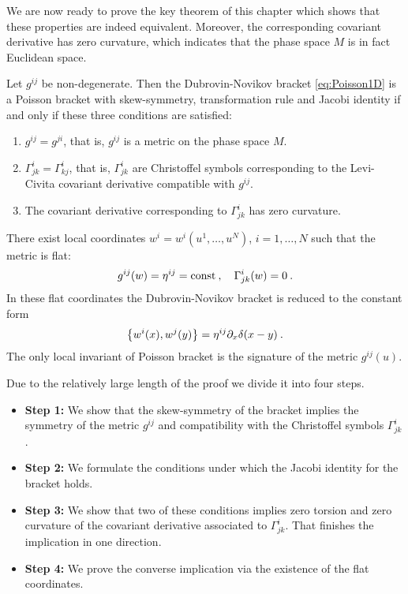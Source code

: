 We are now ready to prove the key theorem of this chapter which shows that these properties are indeed equivalent. Moreover, the corresponding covariant derivative has zero curvature, which indicates that the phase space $M$ is in fact Euclidean space.

\begin{theorem} \label{Theorem-Dubrovin-Novikov-1D}
    Let $g^{ij}$ be non-degenerate. Then the Dubrovin-Novikov bracket \eqref{eq:Poisson1D} is a Poisson bracket with skew-symmetry, transformation rule and Jacobi identity if and only if these three conditions are satisfied:
    \begin{enumerate}
        \item $g^{ij} = g^{ji}$, that is, $g^{ij}$ is a metric on the phase space $M$.
        \item $\Gamma^{i}_{jk} = \Gamma^i_{kj}$, that is, $\Gamma^{i}_{jk}$ are Christoffel symbols corresponding to the Levi-Civita covariant derivative compatible with $g^{ij}$.
        \item The covariant derivative corresponding to $\Gamma^{i}_{jk}$ has zero curvature.
    \end{enumerate}
\end{theorem}

\begin{corollary} \label{Corollary: existence of flat coordinates}
    There exist local coordinates $w^i = w^i(u^1, \dots, u^N)$, $i = 1, \dots, N$ such that the metric is flat:
    \begin{align}
        g^{ij}(w) = \eta^{ij} = \mathrm{const} \:, \quad \Gamma^i_{jk} (w) = 0 \:.
    \end{align}
    In these flat coordinates the Dubrovin-Novikov bracket is reduced to the constant form
    \begin{align}
        \left \lbrace w^i(x),w^j(y) \right \rbrace = \eta^{ij} \partial_x \delta(x-y) \:.
    \end{align}
    The only local invariant of Poisson bracket is the signature of the metric $g^{ij}(u)$.
\end{corollary}

Due to the relatively large length of the proof we divide it into four steps.
\begin{itemize}
    \item \textbf{Step 1:} We show that the skew-symmetry of the bracket implies the symmetry of the metric $g^{ij}$ and compatibility with the Christoffel symbols $\Gamma^i_{jk}$.
    \item \textbf{Step 2:} We formulate the conditions under which the Jacobi identity for the bracket holds.
    \item \textbf{Step 3:} We show that two of these conditions implies zero torsion and zero curvature of the covariant derivative associated to $\Gamma^i_{jk}$. That finishes the implication in one direction.
    \item \textbf{Step 4:} We prove the converse implication via the existence of the flat coordinates.
\end{itemize}

